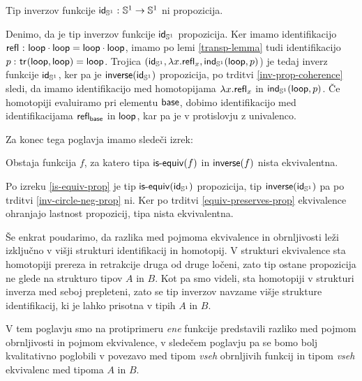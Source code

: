 \begin{trditev}
  \label{inv-circle-neg-prop}
  Tip inverzov funkcije \(\textnormal{\textsf{id}}_{\mathbb{S}^{1}} \,\colon \mathbb{S}^{1} \to \mathbb{S}^{1}\) ni propozicija.
\end{trditev}

\begin{dokaz}
  Denimo, da je tip inverzov funkcije \(\textnormal{\textsf{id}}_{\mathbb{S}^{1}}\) propozicija. Ker imamo identifikacijo \(\textnormal{\textsf{refl}}_{} \,\colon \textnormal{\textsf{loop}} \cdot \textnormal{\textsf{loop}} = \textnormal{\textsf{loop}} \cdot \textnormal{\textsf{loop}}\), imamo po lemi \ref{transp-lemma} tudi identifikacijo \(p \,\colon \textnormal{\textsf{tr}}_{}(\textnormal{\textsf{loop}}, \textnormal{\textsf{loop}}) = \textnormal{\textsf{loop}}\). Trojica
  \((\textnormal{\textsf{id}}_{\mathbb{S}^{1}}, \lambda x. \textnormal{\textsf{refl}}_{x}, \textnormal{\textsf{ind}}_{\mathbb{S}^{1}}(\textnormal{\textsf{loop}}, p)\)) je tedaj inverz funkcije \(\textnormal{\textsf{id}}_{\mathbb{S}^{1}}\), ker pa je \(\textnormal{\textsf{inverse}}(\textnormal{\textsf{id}}_{\mathbb{S}^{1}})\) propozicija, po trditvi \ref{inv-prop-coherence} sledi, da imamo identifikacijo med homotopijama
  \(\lambda x.\textnormal{\textsf{refl}}_{x}\) in \(\textnormal{\textsf{ind}}_{\mathbb{S}^{1}}(\textnormal{\textsf{loop}}, p)\). Če homotopiji evaluiramo pri elementu \(\textnormal{\textsf{base}}\), dobimo identifikacijo med identifikacijama \(\textnormal{\textsf{refl}}_{\textnormal{\textsf{base}}}\) in \(\textnormal{\textsf{loop}}\), kar pa je v protislovju z univalenco.
\end{dokaz}

Za konec tega poglavja imamo sledeči izrek:

\begin{izrek}
  Obstaja funkcija \(f\), za katero tipa \(\textnormal{\textsf{is-equiv}}(f)\) in \(\textnormal{\textsf{inverse}}(f)\) nista ekvivalentna.
\end{izrek}

\begin{dokaz}
  Po izreku \ref{is-equiv-prop} je tip \(\textnormal{\textsf{is-equiv}}(\textnormal{\textsf{id}}_{\mathbb{S}^{1}})\) propozicija, tip \(\textnormal{\textsf{inverse}}(\textnormal{\textsf{id}}_{\mathbb{S}^{1}})\) pa po trditvi \ref{inv-circle-neg-prop} ni. Ker po trditvi \ref{equiv-preserves-prop} ekvivalence ohranjajo lastnost propozicij, tipa nista ekvivalentna.
\end{dokaz}

Še enkrat poudarimo, da razlika med pojmoma ekvivalence in obrnljivosti leži izključno v višji strukturi identifikacij in homotopij. V strukturi ekvivalence sta homotopiji prereza in retrakcije druga od druge ločeni, zato tip ostane propozicija ne glede na strukturo tipov \(A\) in \(B\). Kot pa smo videli, sta homotopiji v strukturi inverza med seboj prepleteni, zato se tip inverzov navzame višje strukture identifikacij, ki je lahko prisotna v tipih \(A\) in \(B\).

V tem poglavju smo na protiprimeru \emph{ene} funkcije predstavili razliko med pojmom obrnljivosti in pojmom ekvivalence, v sledečem poglavju pa se bomo bolj kvalitativno poglobili v povezavo med tipom \emph{vseh} obrnljivih funkcij in tipom \emph{vseh} ekvivalenc med tipoma \(A\) in \(B\).

